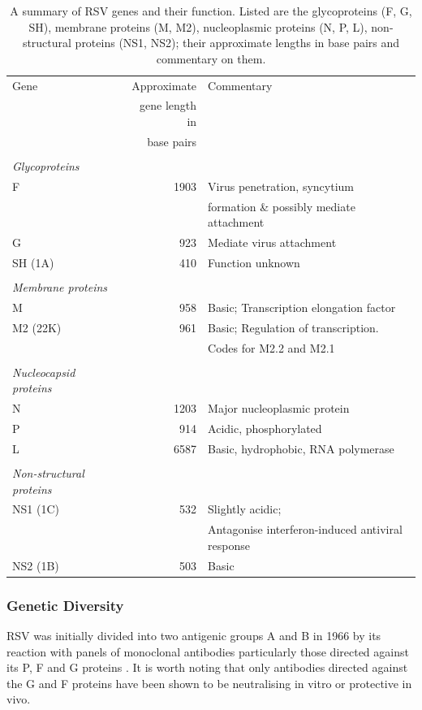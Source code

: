 \documentclass[10pt, a4paper]{article}
\begin{document}
\begin{table}[htbp]
\centering
\begin{tabular}{lrl}
Gene & Approximate & Commentary\\
 & gene length in & \\
 & base pairs & \\
\hline
 &  & \\
\emph{Glycoproteins} &  & \\
F & 1903 & Virus penetration, syncytium\\
 &  & formation \& possibly mediate attachment\\
G & 923 & Mediate virus attachment\\
SH (1A) & 410 & Function unknown\\
 &  & \\
\emph{Membrane proteins} &  & \\
M & 958 & Basic; Transcription elongation factor\\
M2 (22K) & 961 & Basic; Regulation of transcription.\\
 &  & Codes for M2.2 and M2.1\\
 &  & \\
\emph{Nucleocapsid proteins} &  & \\
N & 1203 & Major nucleoplasmic protein\\
P & 914 & Acidic, phosphorylated\\
L & 6587 & Basic, hydrophobic, RNA polymerase\\
 &  & \\
\emph{Non-structural proteins} &  & \\
NS1 (1C) & 532 & Slightly acidic;\\
 &  & Antagonise interferon-induced antiviral response\\
NS2 (1B) & 503 & Basic\\
\end{tabular}
\caption[Summary of RSV Genes]{\label{tab:orgb1a37c3}A summary of RSV genes and their function. Listed are the glycoproteins (F, G, SH), membrane proteins (M, M2), nucleoplasmic proteins (N, P, L), non-structural proteins (NS1, NS2); their approximate lengths in base pairs and commentary on them.}

\end{table}



\subsubsection{Genetic Diversity}
\label{sec:orgc34dd46}
RSV was initially divided into two antigenic groups A and B in 1966 by its
reaction with panels of monoclonal antibodies particularly those directed
against its P, F and G proteins \cite{coatesAntigenicAnalysisRespiratory1966}.
It is worth noting that only antibodies directed against the G and F proteins
have been shown to be neutralising in vitro or protective in vivo. 
\end{document}
